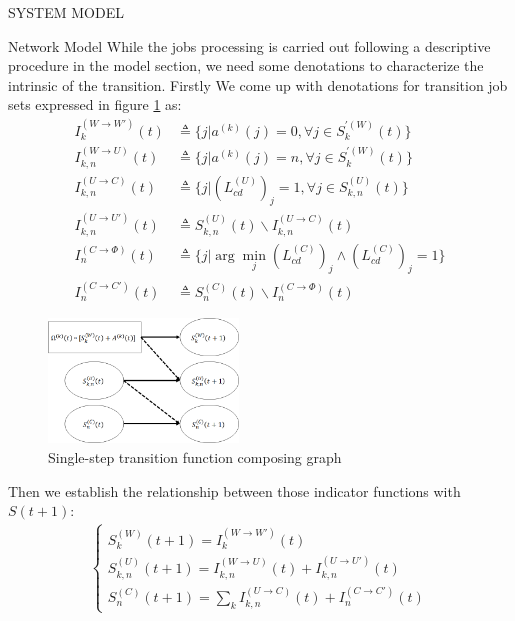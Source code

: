 \documentclass[10pt, conference, letterpaper]{IEEEtran}
\begin{document}
\begin{section}{SYSTEM MODEL}
\begin{subsection}{Network Model}
            While the jobs processing is carried out following a descriptive procedure in the model section, we need some denotations to characterize the intrinsic of the transition. Firstly We come up with denotations for transition job sets expressed in figure \ref{fig:trans} as:
            \begin{align}
                I^{(W \to W')}_{k}(t) & \triangleq \{ j | a^{(k)}(j)=0, \forall j \in S^{'(W)}_k(t)\}
                \\
                I^{(W \to U)}_{k,n}(t) &\triangleq \{ j | a^{(k)}(j)=n, \forall j \in S^{'(W)}_k(t)\}
                \\
                I^{(U \to C)}_{k,n}(t) &\triangleq \{j|(L^{(U)}_{cd})_j=1, \forall j \in S^{(U)}_{k,n}(t)\}
                \\
                I^{(U \to U')}_{k,n}(t) &\triangleq S^{(U)}_{k,n}(t) \backslash I^{(U \to C)}_{k,n}(t)
                \\
                I^{(C \to \Phi)}_{n}(t) &\triangleq \{j|\arg\min_{j} (L^{(C)}_{cd})_j \wedge (L^{(C)}_{cd})_j=1\}
                \\
                I^{(C \to C')}_{n}(t) &\triangleq S^{(C)}_{n}(t) \backslash I^{(C \to \Phi)}_{n}(t)
            \end{align}
            \begin{figure}[h]
                \centering
                \includegraphics[width=0.45\textwidth]{single-transition.png}
                \caption{Single-step transition function composing graph}
                \label{fig:trans}
            \end{figure}
            Then we establish the relationship between those indicator functions with $S(t+1)$:
            \begin{align}
                \begin{cases}
                    S^{(W)}_{k}(t+1) = I^{(W \to W')}_{k}(t)
                    \\
                    S^{(U)}_{k,n}(t+1) = I^{(W \to U)}_{k,n}(t) + I^{(U \to U')}_{k,n}(t)
                    \\
                    S^{(C)}_{n}(t+1) = \sum_k I^{(U \to C)}_{k,n}(t) + I^{(C \to C')}_{n}(t)
                \end{cases}
            \end{align}
        \end{subsection}


\end{section}
\end{document}
